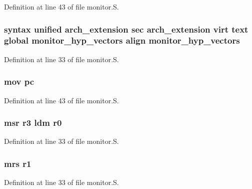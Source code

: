 \-Definition at line 43 of file monitor.\-S.

\hypertarget{monitor_8_s_a4ef4efb0188af1c1fb8dddad7636fc8a}{
\subsubsection[{monitor\-\_\-hyp\-\_\-vectors}]{\setlength{\rightskip}{0pt plus 5cm}syntax unified arch\-\_\-extension sec arch\-\_\-extension virt text global {\bf monitor\-\_\-hyp\-\_\-vectors} align {\bf monitor\-\_\-hyp\-\_\-vectors}}}\label{monitor_8_s_a4ef4efb0188af1c1fb8dddad7636fc8a}


\-Definition at line 33 of file monitor.\-S.

\hypertarget{monitor_8_s_a9c0336e2400aaea86bf8157c919459bc}{
\subsubsection[{pc}]{ mov {\bf pc}}}\label{monitor_8_s_a9c0336e2400aaea86bf8157c919459bc}


\-Definition at line 43 of file monitor.\-S.

\hypertarget{monitor_8_s_ad1c67bb474f6fe7f892f43e3b42fcbcd}{
\subsubsection[{r0}]{ msr r3 ldm {\bf r0}}}\label{monitor_8_s_ad1c67bb474f6fe7f892f43e3b42fcbcd}


\-Definition at line 33 of file monitor.\-S.

\hypertarget{monitor_8_s_aef776bba48a0f8bc4defd2244e15bf63}{
\subsubsection[{r1}]{ mrs {\bf r1}}}\label{monitor_8_s_aef776bba48a0f8bc4defd2244e15bf63}


\-Definition at line 33 of file monitor.\-S.

